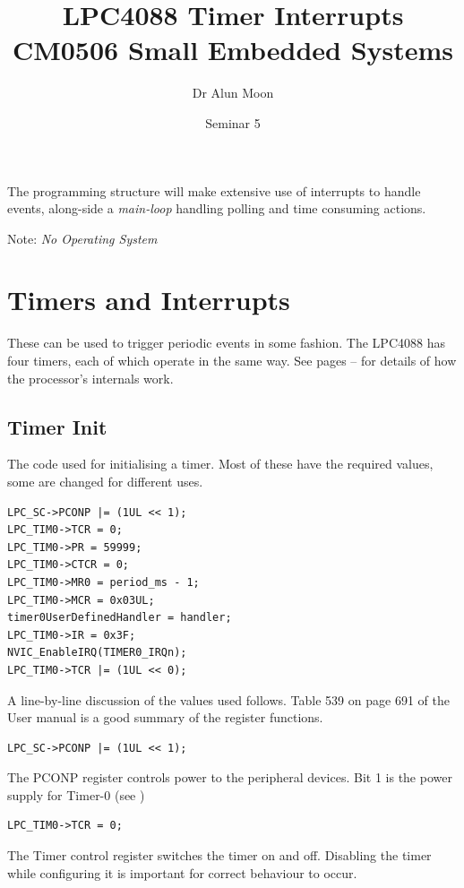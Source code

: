 \documentclass[a4paper]{tufte-handout}
\title{LPC4088 Timer Interrupts\\\small{CM0506 Small Embedded Systems}}
\author{Dr Alun Moon}
\date{Seminar 5}
\begin{document}
\maketitle

The programming structure will make extensive use of interrupts to
handle events, along-side a \emph{main-loop} handling polling and time
consuming actions.

Note: \emph{No Operating System}

\clearpage
\section{Timers and Interrupts}
  These can be used to trigger periodic
events in some fashion.  The LPC4088 has four timers, each of which
operate in the same way.  See pages
\pageref{sec:timer-behavior}--\pageref{sec:timer-behavior-end} for
details of how the processor's internals work.

\subsection{Timer Init}
The code used for initialising a  timer.  Most of these have the
required values, some are changed for different uses.  
\begin{verbatim}
LPC_SC->PCONP |= (1UL << 1);
LPC_TIM0->TCR = 0;
LPC_TIM0->PR = 59999;
LPC_TIM0->CTCR = 0;
LPC_TIM0->MR0 = period_ms - 1;
LPC_TIM0->MCR = 0x03UL;
timer0UserDefinedHandler = handler;
LPC_TIM0->IR = 0x3F;
NVIC_EnableIRQ(TIMER0_IRQn);
LPC_TIM0->TCR |= (1UL << 0);
\end{verbatim}
A line-by-line discussion of the values used follows.  Table 539 on
page 691 of the User manual \citep{lpc4088} is a good summary of the
register functions.

\begin{verbatim}
LPC_SC->PCONP |= (1UL << 1);
\end{verbatim}
The PCONP register controls power to the peripheral devices.  Bit 1 is
the power supply for Timer-0 (see \citep[Table 14, pg.30]{lpc4088})

\begin{verbatim}
LPC_TIM0->TCR = 0;
\end{verbatim}
The Timer control register \citep[24.6.2]{lpc4088} switches the timer
on and off.  Disabling the timer while configuring it is important for
correct behaviour to occur.
\end{document}
